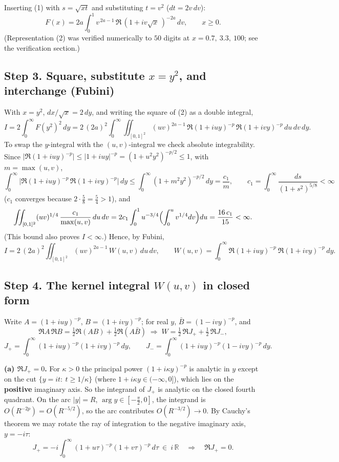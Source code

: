 \documentclass[11pt]{article}
\theoremstyle{remark}
\begin{document}
Inserting (1) with $s=\sqrt{xt}$ and substituting $t=v^2$ ($dt=2v\,dv$):
\begin{equation}
F(x)=2a\int_0^1 v^{\,2a-1}\,\Re\,(1+iv\sqrt x\,)^{-2a}\,dv ,\qquad x\ge 0. \tag{2}
\end{equation}
(Representation (2) was verified numerically to $50$ digits at $x=0.7,\ 3.3,\ 100$; see the verification section.)

\subsection*{Step 3. Square, substitute $x=y^2$, and interchange (Fubini)}

With $x=y^2$, $dx/\sqrt x=2\,dy$, and writing the square of (2) as a double integral,
$$
I=2\int_0^\infty F(y^2)^2\,dy
=2\,(2a)^2\int_0^\infty\!\!\iint_{[0,1]^2}(uv)^{2a-1}\,
\Re(1+iuy)^{-p}\,\Re(1+ivy)^{-p}\,du\,dv\,dy .
$$
To swap the $y$-integral with the $(u,v)$-integral we check absolute integrability. Since $\bigl|\Re(1+iuy)^{-p}\bigr|\le|1+iuy|^{-p}=(1+u^2y^2)^{-p/2}\le 1$, with $m=\max(u,v)$,
$$\int_0^\infty\bigl|\Re(1+iuy)^{-p}\,\Re(1+ivy)^{-p}\bigr|\,dy
\le\int_0^\infty(1+m^2y^2)^{-p/2}\,dy=\frac{c_1}{m},\qquad
c_1=\int_0^\infty\frac{ds}{(1+s^2)^{5/8}}<\infty$$
($c_1$ converges because $2\cdot\tfrac58=\tfrac54>1$), and
$$\iint_{[0,1]^2}(uv)^{1/4}\,\frac{c_1}{\max(u,v)}\,du\,dv
=2c_1\int_0^1 u^{-3/4}\Bigl(\int_0^u v^{1/4}dv\Bigr)du=\frac{16\,c_1}{15}<\infty .$$
(This bound also proves $I<\infty$.) Hence, by Fubini,
\begin{equation}
I=2\,(2a)^2\iint_{[0,1]^2}(uv)^{2a-1}\,W(u,v)\,du\,dv,\qquad
W(u,v)=\int_0^\infty \Re(1+iuy)^{-p}\ \Re(1+ivy)^{-p}\,dy . \tag{3}
\end{equation}

\subsection*{Step 4. The kernel integral $W(u,v)$ in closed form}

Write $A=(1+iuy)^{-p}$, $B=(1+ivy)^{-p}$; for real $y$, $\bar B=(1-ivy)^{-p}$, and
$$\Re A\,\Re B=\tfrac12\Re(AB)+\tfrac12\Re(A\bar B)
\;\Longrightarrow\;
W=\tfrac12\,\Re J_{+}+\tfrac12\,\Re J_{-},$$
$$J_{+}=\int_0^\infty (1+iuy)^{-p}(1+ivy)^{-p}\,dy,\qquad
J_{-}=\int_0^\infty (1+iuy)^{-p}(1-ivy)^{-p}\,dy .$$

\textbf{(a) $\Re J_{+}=0$.} For $\kappa>0$ the principal power $(1+i\kappa y)^{-p}$ is analytic in $y$ except on the cut $\{y=it:\ t\ge 1/\kappa\}$ (where $1+i\kappa y\in(-\infty,0]$), which lies on the \textbf{positive} imaginary axis. So the integrand of $J_+$ is analytic on the closed fourth quadrant. On the arc $|y|=R$, $\arg y\in[-\tfrac\pi2,0]$, the integrand is $O(R^{-2p})=O(R^{-5/2})$, so the arc contributes $O(R^{-3/2})\to0$. By Cauchy's theorem we may rotate the ray of integration to the negative imaginary axis, $y=-i\tau$:
$$J_{+}=-i\int_0^\infty (1+u\tau)^{-p}(1+v\tau)^{-p}\,d\tau\ \in\ i\,\mathbb R
\quad\Longrightarrow\quad \Re J_{+}=0 .$$
\end{document}
